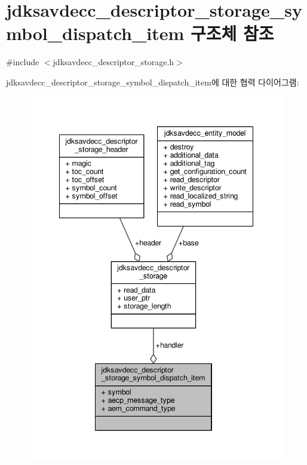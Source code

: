 \hypertarget{structjdksavdecc__descriptor__storage__symbol__dispatch__item}{}\section{jdksavdecc\+\_\+descriptor\+\_\+storage\+\_\+symbol\+\_\+dispatch\+\_\+item 구조체 참조}
\label{structjdksavdecc__descriptor__storage__symbol__dispatch__item}


{\ttfamily \#include $<$jdksavdecc\+\_\+descriptor\+\_\+storage.\+h$>$}



jdksavdecc\+\_\+descriptor\+\_\+storage\+\_\+symbol\+\_\+dispatch\+\_\+item에 대한 협력 다이어그램\+:
\nopagebreak
\begin{figure}[H]
\begin{center}
\leavevmode
\includegraphics[width=342pt]{structjdksavdecc__descriptor__storage__symbol__dispatch__item__coll__graph}
\end{center}
\end{figure}
